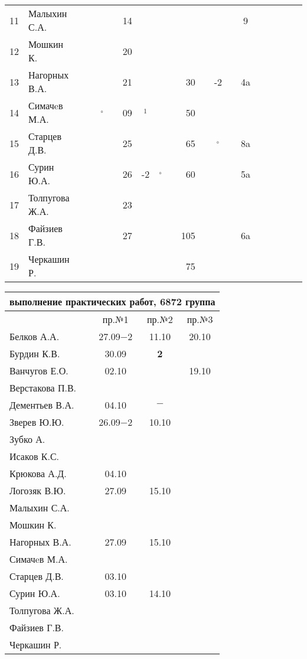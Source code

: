 \documentclass[a4paper,landscape,11pt]{article}
\newcommand*\OK{&\small \ding{51}$\!\!_\circ$} %
\newcommand*\Ok{&\small \ding{51}$\!\!_\circ$} %
\newcommand*\ok{&{\small\ding{51}}} %
\newcommand*\no{&{\small }} %
\newcommand*\da{&{\small\ding{48}$\!\!_1$}} %
\begin{document}
\begin{tabular}{l|l|ccccccccrccccccccc}
11& Малыхин С.А.     \ok\no\ok\ok&14\no\no\no \no\no\ok\ok&  9\no&&&\\
12& Мошкин К.        \ok\ok\ok\ok&20\ok\no\no \no\no\no\ok \no\no&&&\\
13& Нагорных В.А.    \ok\ok\ok\ok&21\ok\ok\ok& 30\ok&-2\ok& 4a\ok&&&\\
14& Симачeв М.А.     \ok\ok\OK\ok&09\da\no\no& 50\no\no\no \no\no&&&\\
15& Старцев Д.В.     \ok\ok\ok\ok&25\ok\ok\ok& 65\ok\Ok\ok& 8a\ok&&&\\
16& Сурин Ю.А.       \ok\ok\ok\ok&26&-2\OK\ok& 60\ok\ok\ok& 5a\ok&&&\\
17& Толпугова Ж.А.   \no\no\no\no&23\ok\no\no \no\no\no\no\no\no&&&\\
18& Файзиев Г.В.     \ok\ok\ok\ok&27\ok\ok\ok&105\ok\ok\ok& 6a\ok&&&\\
19& Черкашин Р.      \ok\ok\ok\ok\no\no\no\no& 75\no\ok\ok \no\no&&&\\ 
\bottomrule
\end{tabular} 

\newpage
\begin{tabular}{l|ccc}
\multicolumn{4}{c}{выполнение практических работ, 6872 группа} \\
\toprule
& пр.№1 & пр.№2 & пр.№3 \\
\midrule
Белков А.А.    &27.09$-2$&11.10  &20.10\\   
Бурдин К.В.    &30.09    &{\bf 2}&\\
Ванчугов Е.О.  &02.10    &       &19.10\\
Верстакова П.В.&         &       &\\
Дементьев В.А. &04.10    &$-$    &\\
Зверев Ю.Ю.    &26.09$-2$&10.10  &\\
Зубко А.       &         &       &\\
Исаков К.С.    &         &       &\\
Крюкова А.Д.   &04.10    &       &\\
Логозяк В.Ю.   &27.09    &15.10  &\\
Малыхин С.А.   &         &       &\\
Мошкин К.      &         &       &\\
Нагорных В.А.  &27.09    &15.10  &\\
Симачeв М.А.   &         &       &\\
Старцев Д.В.   &03.10    &       &\\
Сурин Ю.А.     &03.10    &14.10  &\\
Толпугова Ж.А. &         &       &\\
Файзиев Г.В.   &         &       &\\
Черкашин Р.    &         &       &\\
\bottomrule
\end{tabular}
\end{document}
